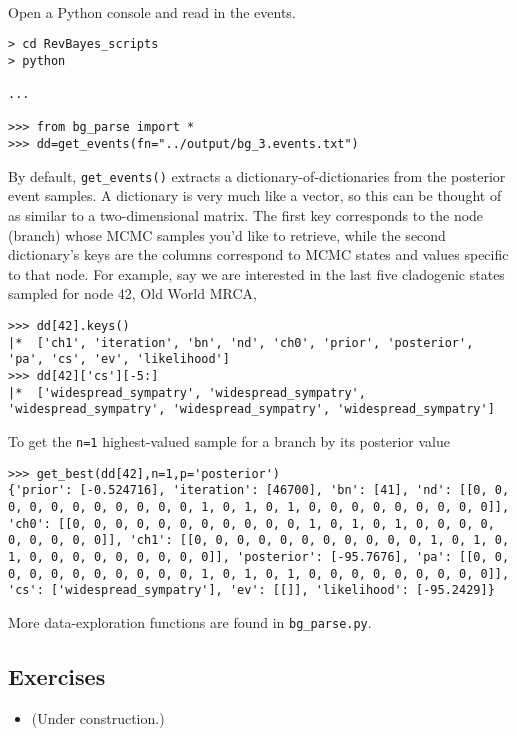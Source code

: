 \noindent \\ \impmark  Open a Python console and read in the events.

\begin{snugshade}
\begin{lstlisting}
> cd RevBayes_scripts
> python

...

>>> from bg_parse import *
>>> dd=get_events(fn="../output/bg_3.events.txt")
\end{lstlisting}
\end{snugshade}

By default, {\tt get\_events()} extracts a dictionary-of-dictionaries from the posterior event samples.
A dictionary is very much like a vector, so this can be thought of as similar to a two-dimensional matrix.
The first key corresponds to the node (branch) whose MCMC samples you'd like to retrieve, while the second dictionary's keys are the columns correspond to MCMC states and values specific to that node. For example, say we are interested in the last five cladogenic states sampled for node 42, Old World MRCA,
\begin{snugshade}
\begin{lstlisting}
>>> dd[42].keys()
|*  ['ch1', 'iteration', 'bn', 'nd', 'ch0', 'prior', 'posterior', 'pa', 'cs', 'ev', 'likelihood']
>>> dd[42]['cs'][-5:]
|*  ['widespread_sympatry', 'widespread_sympatry', 'widespread_sympatry', 'widespread_sympatry', 'widespread_sympatry']
\end{lstlisting}
\end{snugshade}

To get the {\tt n=1} highest-valued sample for a branch by its posterior value
\begin{snugshade}
\begin{lstlisting}
>>> get_best(dd[42],n=1,p='posterior')
{'prior': [-0.524716], 'iteration': [46700], 'bn': [41], 'nd': [[0, 0, 0, 0, 0, 0, 0, 0, 0, 0, 0, 1, 0, 1, 0, 1, 0, 0, 0, 0, 0, 0, 0, 0, 0]], 'ch0': [[0, 0, 0, 0, 0, 0, 0, 0, 0, 0, 0, 1, 0, 1, 0, 1, 0, 0, 0, 0, 0, 0, 0, 0, 0]], 'ch1': [[0, 0, 0, 0, 0, 0, 0, 0, 0, 0, 0, 1, 0, 1, 0, 1, 0, 0, 0, 0, 0, 0, 0, 0, 0]], 'posterior': [-95.7676], 'pa': [[0, 0, 0, 0, 0, 0, 0, 0, 0, 0, 0, 1, 0, 1, 0, 1, 0, 0, 0, 0, 0, 0, 0, 0, 0]], 'cs': ['widespread_sympatry'], 'ev': [[]], 'likelihood': [-95.2429]}
\end{lstlisting}
\end{snugshade}

More data-exploration functions are found in {\tt bg\_parse.py}.

\subsection{Exercises}

\begin{itemize}
\item (Under construction.)
\end{itemize}
